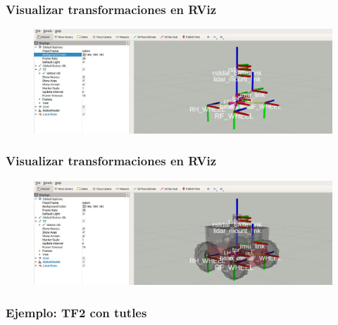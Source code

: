 \begin{frame}
	\frametitle{Visualizar transformaciones en RViz}
	
   	\begin{figure}[!h]
		\centering
			\includegraphics[width=\columnwidth]{images/tf2_tree_rviz.png}
	\end{figure}
	
\end{frame}

\begin{frame}
	\frametitle{Visualizar transformaciones en RViz}
	\begin{figure}[!h]
		\centering
		\includegraphics[width=\columnwidth]{images/tf2_tree_robot_rviz.png}
	\end{figure}
	
\end{frame}

\begin{frame}
	\frametitle{Ejemplo: TF2 con tutles}
	
	
	
\end{frame}

